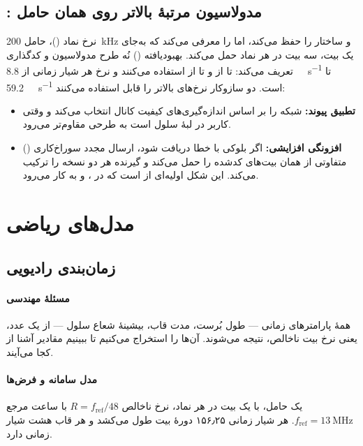 \documentclass[11pt,a4paper]{article}
\begin{document}
\subsection{: مدولاسیون مرتبهٔ بالاتر روی همان حامل}
 نرخ نماد  ()، حامل \qty{200}{\kilo\hertz} و ساختار
 را حفظ می‌کند، اما  را معرفی می‌کند که به‌جای یک بیت، سه بیت در هر
نماد حمل می‌کند.  بهبودیافته () نُه طرح مدولاسیون و کدگذاری تعریف
می‌کند:  تا  از  و  تا  از 
استفاده می‌کنند و نرخ هر شیار زمانی از \qty{8.8}{\kilo\bit\per\second} تا
\qty{59.2}{\kilo\bit\per\second} است. دو سازوکار نرخ‌های بالاتر را قابل استفاده می‌کنند:
\begin{itemize}
  \item \textbf{تطبیق پیوند:} شبکه  را بر اساس اندازه‌گیری‌های کیفیت کانال
        انتخاب می‌کند و وقتی کاربر در لبهٔ سلول است به طرحی مقاوم‌تر می‌رود.
  \item \textbf{افزونگی افزایشی:} اگر بلوکی با خطا دریافت شود، ارسال مجدد سوراخ‌کاری
        () متفاوتی از همان بیت‌های کدشده را حمل می‌کند و گیرنده هر دو نسخه را
        ترکیب می‌کند. این شکل اولیه‌ای از  است که در ،  و
         به کار می‌رود.
\end{itemize}

\section{مدل‌های ریاضی}\label{sec:models}

\subsection{زمان‌بندی رادیویی }\label{sec:timing}
\paragraph{مسئلهٔ مهندسی} همهٔ پارامترهای زمانی  --- طول بُرست، مدت قاب،
بیشینهٔ شعاع سلول --- از یک عدد، یعنی نرخ بیت ناخالص، نتیجه می‌شوند. آن‌ها را استخراج
می‌کنیم تا ببینیم مقادیر آشنا از کجا می‌آیند.

\paragraph{مدل سامانه و فرض‌ها} یک حامل،  با یک بیت در هر نماد، نرخ ناخالص
$R = f_{\mathrm{ref}}/48$ با ساعت مرجع $f_{\mathrm{ref}} = \qty{13}{\mega\hertz}$. هر شیار
زمانی ۱۵۶٫۲۵ دورهٔ بیت طول می‌کشد و هر قاب  هشت شیار زمانی دارد.
\end{document}
